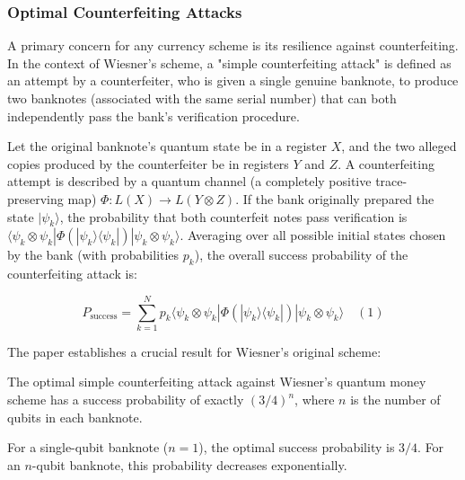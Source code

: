 \documentclass{article} %
\begin{document}

\subsubsection{Optimal Counterfeiting Attacks}

A primary concern for any currency scheme is its resilience against counterfeiting. In the context of Wiesner's scheme, a "simple counterfeiting attack" is defined as an attempt by a counterfeiter, who is given a single genuine banknote, to produce two banknotes (associated with the same serial number) that can both independently pass the bank's verification procedure.

Let the original banknote's quantum state be in a register $X$, and the two alleged copies produced by the counterfeiter be in registers $Y$ and $Z$. A counterfeiting attempt is described by a quantum channel (a completely positive trace-preserving map) $\Phi: L(X) \rightarrow L(Y \otimes Z)$. If the bank originally prepared the state $|\psi_k\rangle$, the probability that both counterfeit notes pass verification is $\langle \psi_k \otimes \psi_k | \Phi(|\psi_k\rangle\langle\psi_k|) | \psi_k \otimes \psi_k \rangle$. Averaging over all possible initial states chosen by the bank (with probabilities $p_k$), the overall success probability of the counterfeiting attack is:

$$P_{\text{success}} = \sum_{k=1}^{N} p_k \langle \psi_k \otimes \psi_k | \Phi(|\psi_k\rangle\langle\psi_k|) | \psi_k \otimes \psi_k \rangle \quad (1)$$

The paper establishes a crucial result for Wiesner's original scheme:
\begin{tcolorbox}[
    skin=freelance,
    title={Theorem 1 (Molina, Vidick, Watrous, 2012)}
]
The optimal simple counterfeiting attack against Wiesner's quantum money scheme has a success probability of exactly $(3/4)^n$, where $n$ is the number of qubits in each banknote.
\end{tcolorbox}

For a single-qubit banknote ($n=1$), the optimal success probability is $3/4$. For an $n$-qubit banknote, this probability decreases exponentially.
\end{document}
